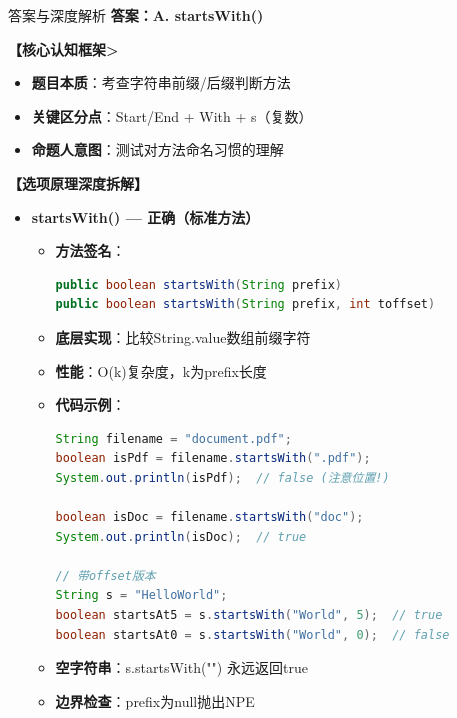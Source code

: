 \documentclass[12pt, a4paper]{ctexart}
\begin{document}
\begin{enumerate}[label=\textbf{\arabic*.}]
	      \begin{bluebox}{答案与深度解析}
		      \textbf{答案：A. startsWith()}

		      \textbf{【核心认知框架>}
		      \begin{itemize}[label={}, leftmargin=*, nosep]
			      \item \textbf{题目本质}：考查字符串前缀/后缀判断方法
			      \item \textbf{关键区分点}：Start/End + With + s（复数）
			      \item \textbf{命题人意图}：测试对方法命名习惯的理解
		      \end{itemize}

		      \textbf{【选项原理深度拆解】}

		      \begin{itemize}[leftmargin=*, nosep, label={}]
			      \item[A] \textbf{startsWith() — 正确（标准方法）}
			            \begin{itemize}[label={}, leftmargin=*, nosep]
				            \item \textbf{方法签名}：
				                  \begin{lstlisting}[language=Java]
public boolean startsWith(String prefix)
public boolean startsWith(String prefix, int toffset)
				            \end{lstlisting}
				            \item \textbf{底层实现}：比较String.value数组前缀字符
				            \item \textbf{性能}：O(k)复杂度，k为prefix长度
				            \item \textbf{代码示例}：
				                  \begin{lstlisting}[language=Java]
String filename = "document.pdf";
boolean isPdf = filename.startsWith(".pdf");
System.out.println(isPdf);  // false (注意位置!)

boolean isDoc = filename.startsWith("doc");
System.out.println(isDoc);  // true

// 带offset版本
String s = "HelloWorld";
boolean startsAt5 = s.startsWith("World", 5);  // true
boolean startsAt0 = s.startsWith("World", 0);  // false
				            \end{lstlisting}
				            \item \textbf{空字符串}：s.startsWith("") 永远返回true
				            \item \textbf{边界检查}：prefix为null抛出NPE
			            \end{itemize}


\end{itemize}
\end{bluebox}
\end{enumerate}
\end{document}
